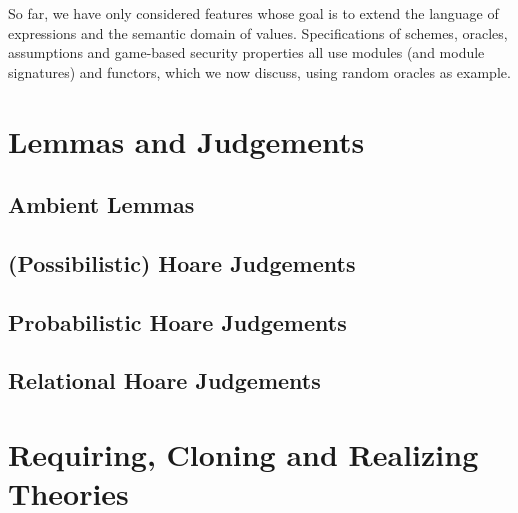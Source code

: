 So far, we have only considered features whose goal is to extend the language of
expressions and the semantic domain of values. Specifications of schemes,
oracles, assumptions and game-based security properties all use modules (and
module signatures) and functors, which we now discuss, using random oracles as
example.

\section{Lemmas and Judgements}

\subsection{Ambient Lemmas}

\subsection{(Possibilistic) Hoare Judgements}

\subsection{Probabilistic Hoare Judgements}

\subsection{Relational Hoare Judgements}

\section{Requiring, Cloning and Realizing Theories\label{sec:cloning}}

